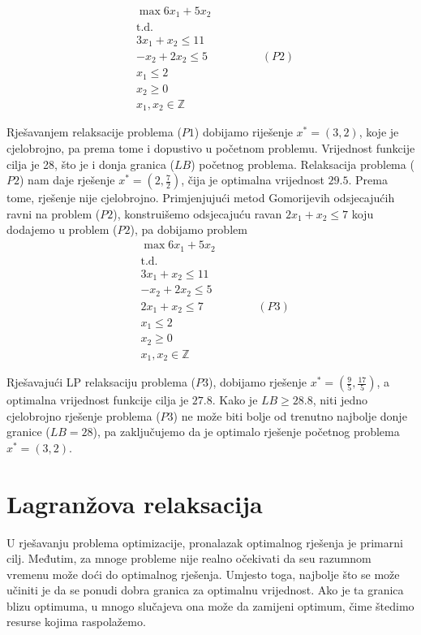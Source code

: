 \documentclass[a4paper, utf8, 11pt, colorlinks]{book}
\theoremstyle{definition}
\begin{document}
\begin{align*}
    &\max 6 x_1 + 5 x_2 \\
      &  \mbox{t.d. } \\
    & 3x_1 + x_2 \leq 11 \\
    & - x_2 + 2 x_2 \leq 5 \hspace{2cm} (P2) \\
    & x_1  \leq 2 \\
    & x_2 \geq 0 \\
    & x_1, x_2 \in \mathbb{Z}
\end{align*}

Rješavanjem relaksacije problema ($P1$) dobijamo riješenje $x^*=(3,2)$, koje je cjelobrojno, pa prema tome i dopustivo u početnom problemu. Vrijednost funkcije cilja je 28, što je i donja granica ($LB$) početnog problema. Relaksacija problema ($P2$) nam daje rješenje $x^*=(2, \frac{7}{2})$, čija je optimalna vrijednost $29.5$.  Prema tome, rješenje nije cjelobrojno. Primjenjujući metod Gomorijevih odsjecajućih ravni na problem ($P2$), konstruišemo odsjecajuću ravan $2x_1 + x_2 \leq 7$ koju dodajemo u problem ($P2$), pa dobijamo problem 
\begin{align*}
    &\max 6 x_1 + 5 x_2 \\
    & \mbox{t.d. } \\
    & 3x_1 + x_2 \leq 11 \\
    & - x_2 + 2 x_2 \leq 5  \\
    & 2x_1 + x_2 \leq 7 \hspace{2cm} (P3)\\ 
    & x_1  \leq 2 \\
    & x_2 \geq 0 \\
    & x_1, x_2 \in \mathbb{Z}
\end{align*}

Rješavajući LP relaksaciju problema ($P3$), dobijamo rješenje $x^*=(\frac{9}{5}, \frac{17}{5})$, a  optimalna vrijednost funkcije cilja je $27.8$. Kako je $LB \geq 28.8$, niti jedno cjelobrojno rješenje problema ($P3$) ne može biti bolje od trenutno najbolje donje granice ($LB=28$), pa zaključujemo da je optimalo rješenje početnog problema $x^*=(3,2)$. 

\section{Lagranžova relaksacija}
U rješavanju problema optimizacije, pronalazak optimalnog rješenja je primarni cilj. Međutim, za mnoge probleme nije realno očekivati da seu razumnom vremenu može doći do optimalnog rješenja. Umjesto toga, najbolje što se može učiniti je da se ponudi dobra  granica za optimalnu vrijednost. Ako je ta granica blizu optimuma, u mnogo slučajeva ona može da zamijeni optimum, čime štedimo resurse kojima raspolažemo. 
\end{document}
